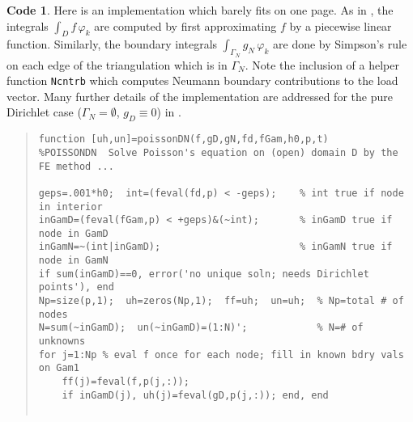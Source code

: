 \documentclass[12pt]{amsart}
\theoremstyle{definition}
\newtheorem*{code}{Code}
\newcommand{\mtt}{\texttt}
\newcommand{\vf}{\varphi}
\begin{document}
\begin{code}  Here is an implementation which barely fits on one page.  As in \cite{Buelerpoisson}, the integrals $\int_D f \,\vf_k$ are computed by first approximating $f$ by a piecewise linear function.  Similarly, the boundary integrals $\int_{\Gamma_N} g_N \,\vf_k$ are done by Simpson's rule on each edge of the triangulation which is in $\Gamma_N$.  Note the inclusion of a helper function \mtt{Ncntrb} which computes Neumann boundary contributions to the load vector.   Many further details of the implementation are addressed for the pure Dirichlet case ($\Gamma_N=\emptyset$, $g_D\equiv 0$) in \cite{Buelerpoisson}.

\medskip\scriptsize\begin{quote}\begin{verbatim}
function [uh,un]=poissonDN(f,gD,gN,fd,fGam,h0,p,t)
%POISSONDN  Solve Poisson's equation on (open) domain D by the FE method ...

geps=.001*h0;  int=(feval(fd,p) < -geps);    % int true if node in interior
inGamD=(feval(fGam,p) < +geps)&(~int);       % inGamD true if node in GamD
inGamN=~(int|inGamD);                        % inGamN true if node in GamN
if sum(inGamD)==0, error('no unique soln; needs Dirichlet points'), end
Np=size(p,1);  uh=zeros(Np,1);  ff=uh;  un=uh;  % Np=total # of nodes
N=sum(~inGamD);  un(~inGamD)=(1:N)';            % N=# of unknowns
for j=1:Np % eval f once for each node; fill in known bdry vals on Gam1
    ff(j)=feval(f,p(j,:)); 
    if inGamD(j), uh(j)=feval(gD,p(j,:)); end, end   


\end{verbatim}
\end{quote}
\end{code}
\end{document}
